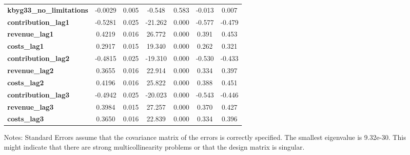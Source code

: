\begin{center}
\begin{tabular}{lcccccc}
\textbf{kbyg33\_no\_limitations}          &      -0.0029  &        0.005     &    -0.548  &         0.583        &       -0.013    &        0.007     \\
\textbf{contribution\_lag1}               &      -0.5281  &        0.025     &   -21.262  &         0.000        &       -0.577    &       -0.479     \\
\textbf{revenue\_lag1}                    &       0.4219  &        0.016     &    26.772  &         0.000        &        0.391    &        0.453     \\
\textbf{costs\_lag1}                      &       0.2917  &        0.015     &    19.340  &         0.000        &        0.262    &        0.321     \\
\textbf{contribution\_lag2}               &      -0.4815  &        0.025     &   -19.310  &         0.000        &       -0.530    &       -0.433     \\
\textbf{revenue\_lag2}                    &       0.3655  &        0.016     &    22.914  &         0.000        &        0.334    &        0.397     \\
\textbf{costs\_lag2}                      &       0.4196  &        0.016     &    25.822  &         0.000        &        0.388    &        0.451     \\
\textbf{contribution\_lag3}               &      -0.4942  &        0.025     &   -20.023  &         0.000        &       -0.543    &       -0.446     \\
\textbf{revenue\_lag3}                    &       0.3984  &        0.015     &    27.257  &         0.000        &        0.370    &        0.427     \\
\textbf{costs\_lag3}                      &       0.3650  &        0.016     &    22.839  &         0.000        &        0.334    &        0.396     \\
\bottomrule
\end{tabular}
\end{center}

Notes: \newline
 [1] Standard Errors assume that the covariance matrix of the errors is correctly specified. \newline
 [2] The smallest eigenvalue is 9.32e-30. This might indicate that there are \newline
 strong multicollinearity problems or that the design matrix is singular.